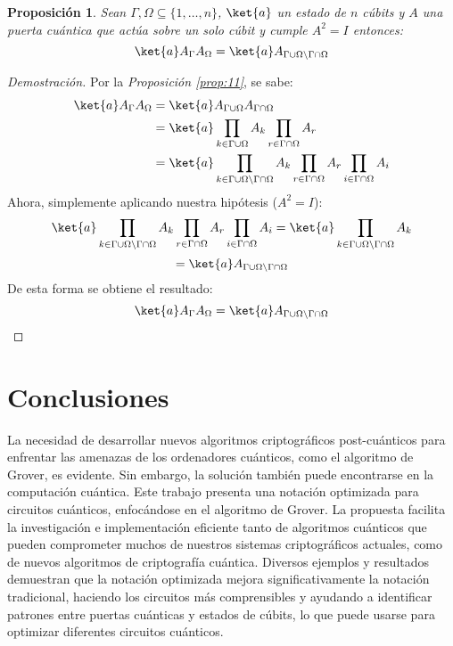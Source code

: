 \documentclass[10pt,conference,a4paper]{IEEEtran}
\newtheorem{prop}{Proposición}[section]
\begin{document}
\vspace{1mm}
\begin{prop}
    Sean $\Gamma, \Omega\subseteq \{1,\ldots, n\}$, $\ket{a}$ un estado de $n$ cúbits y $A$ una puerta cuántica que actúa sobre un solo cúbit y cumple $A^2=I$ entonces:
    $$\ket{a}A_{\Gamma}A_{\Omega}=\ket{a}A_{\Gamma\cup\Omega\backslash\Gamma\cap\Omega}$$
\end{prop}
\begin{proof}[Demostración] 
    Por la \textit{Proposición \ref{prop:11}}, se sabe: 
    \begin{align*}
        \ket{a}A_{\Gamma}A_{\Omega}&=\ket{a}A_{\Gamma\cup\Omega}A_{\Gamma\cap\Omega}\\
        &=\ket{a}\prod_{k\in\Gamma\cup\Omega}A_k\prod_{r\in\Gamma\cap\Omega}A_r\\
        &=\ket{a}\prod_{k\in\Gamma\cup\Omega\backslash\Gamma\cap\Omega}A_k\prod_{r\in\Gamma\cap\Omega}A_r\prod_{i\in\Gamma\cap\Omega}A_i
    \end{align*}
    Ahora, simplemente aplicando nuestra hipótesis ($A^2=I$):
    $$\ket{a}\prod_{k\in\Gamma\cup\Omega\backslash\Gamma\cap\Omega}A_k\prod_{r\in\Gamma\cap\Omega}A_r\prod_{i\in\Gamma\cap\Omega}A_i=\ket{a}\prod_{k\in\Gamma\cup\Omega\backslash\Gamma\cap\Omega}A_k$$
    $$=\ket{a}A_{\Gamma\cup\Omega\backslash\Gamma\cap\Omega}$$
    De esta forma se obtiene el resultado:
    $$\ket{a}A_{\Gamma}A_{\Omega}=\ket{a}A_{\Gamma\cup\Omega\backslash\Gamma\cap\Omega}$$
\end{proof}


\section{Conclusiones}
\label{seccion:6}

La necesidad de desarrollar nuevos algoritmos criptográficos post-cuánticos para enfrentar las amenazas de los ordenadores cuánticos, como el algoritmo de Grover, es evidente. Sin embargo, la solución también puede encontrarse en la computación cuántica. Este trabajo presenta una notación optimizada para circuitos cuánticos, enfocándose en el algoritmo de Grover. La propuesta facilita la investigación e implementación eficiente tanto de algoritmos cuánticos que pueden comprometer muchos de nuestros sistemas criptográficos actuales, como de nuevos algoritmos de criptografía cuántica. Diversos ejemplos y resultados demuestran que la notación optimizada  mejora significativamente la notación tradicional, haciendo los circuitos   más comprensibles y  ayudando a  identificar patrones entre   puertas cuánticas y   estados de   cúbits, lo que puede usarse para optimizar diferentes circuitos cuánticos.
\end{document}
